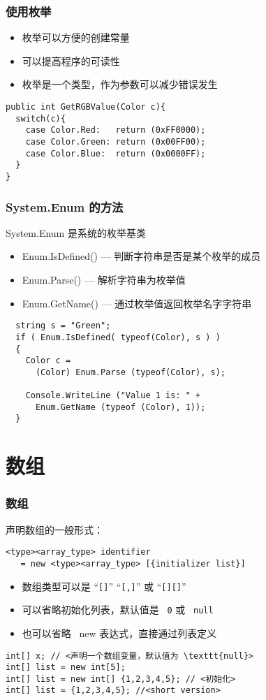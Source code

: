 \begin{frame}[fragile]
\frametitle{使用枚举}
\begin{itemize}
\item 枚举可以方便的创建常量
\item 可以提高程序的可读性
\item 枚举是一个类型，作为参数可以减少错误发生
\end{itemize}
\begin{lstlisting}
public int GetRGBValue(Color c){
  switch(c){
    case Color.Red:   return (0xFF0000);
    case Color.Green: return (0x00FF00);
    case Color.Blue:  return (0x0000FF);
  }
}
\end{lstlisting}

\end{frame}

\begin{frame}[fragile]
\frametitle{System.Enum 的方法}
System.Enum 是系统的枚举基类
\begin{itemize}
\item Enum.IsDefined() --- 判断字符串是否是某个枚举的成员
\item Enum.Parse() --- 解析字符串为枚举值
\item Enum.GetName() --- 通过枚举值返回枚举名字字符串
\end{itemize}
\pause
\begin{lstlisting}
  string s = "Green";
  if ( Enum.IsDefined( typeof(Color), s ) )
  {
    Color c =
      (Color) Enum.Parse (typeof(Color), s);

    Console.WriteLine ("Value 1 is: " +
      Enum.GetName (typeof (Color), 1));
  }
\end{lstlisting}
\end{frame}

\section{数组}

\begin{frame}[fragile]
\frametitle{数组}
声明数组的一般形式：
\begin{lstlisting}
<type><array_type> identifier
   = new <type><array_type> [{initializer list}]
\end{lstlisting}
\begin{itemize}
\item 数组类型可以是 ``\texttt{[]}'' ``\texttt{[,]}'' 或 ``\texttt{[][]}''
\item 可以省略初始化列表，默认值是 ~{\redwarn\texttt{0}} 或 ~{\redwarn\texttt{null}}
\item 也可以省略 ~new 表达式，直接通过列表定义
\end{itemize}
\pause
\begin{lstlisting}[escapeinside=<>]
int[] x; // <声明一个数组变量，默认值为 \texttt{null}>
int[] list = new int[5];
int[] list = new int[] {1,2,3,4,5}; // <初始化>
int[] list = {1,2,3,4,5}; //<short version>
\end{lstlisting}
\end{frame}


